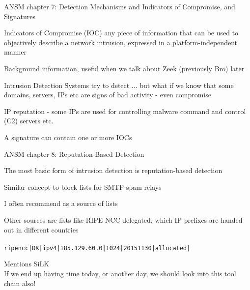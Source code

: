 \documentclass[Screen16to9,17pt]{foils}
\begin{document}


\begin{list1}
\item ANSM chapter 7: Detection Mechanisms and Indicators of Compromise, and Signatures

\begin{list2}
\item Indicators of Compromise (IOC) any piece of information that can be used to objectively describe a
network intrusion, expressed in a platform-independent manner
\item Background information, useful when we talk about Zeek (previously Bro) later
\item Intrusion Detection Systems try to detect ... but what if we know that some domains, servers, IPs etc are signs of bad activity - even compromise
\item IP reputation - some IPs are used for controlling malware command and control (C2) servers etc.
\item A signature can contain one or more IOCs
\end{list2}
\end{list1}




\begin{list1}
\item ANSM chapter 8: Reputation-Based Detection
\begin{list2}
\item The most basic form of intrusion detection is reputation-based detection
\item Similar concept to block lists for SMTP spam relays
\item I often recommend  as a source of lists
\item Other sources are lists like RIPE NCC delegated, which IP prefixes are handed out in different countries\\
\\
\verb+ripencc|DK|ipv4|185.129.60.0|1024|20151130|allocated|+
\item Mentions SiLK \\
If we end up having time today, or another day, we should look into this tool chain also!
\end{list2}
\end{list1}
\end{document}
